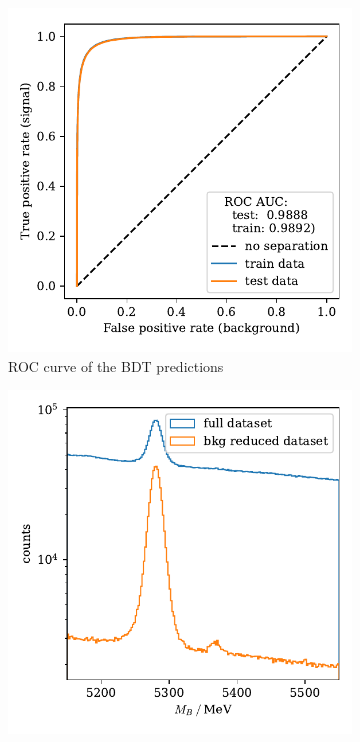 \begin{figure}
    \centering
    \begin{subfigure}{0.5\textwidth}
        \centering
        \includegraphics[width=\textwidth]{images/BKG_BDT_ROC.pdf}
        \caption{ROC curve of the BDT predictions}
        \label{fig:BKG_BDT_ROC}
    \end{subfigure}%
    \begin{subfigure}{0.5\textwidth}
        \centering
        \includegraphics[width=\textwidth]{images/BKG_reduced.pdf}

\end{subfigure}
\end{figure}
